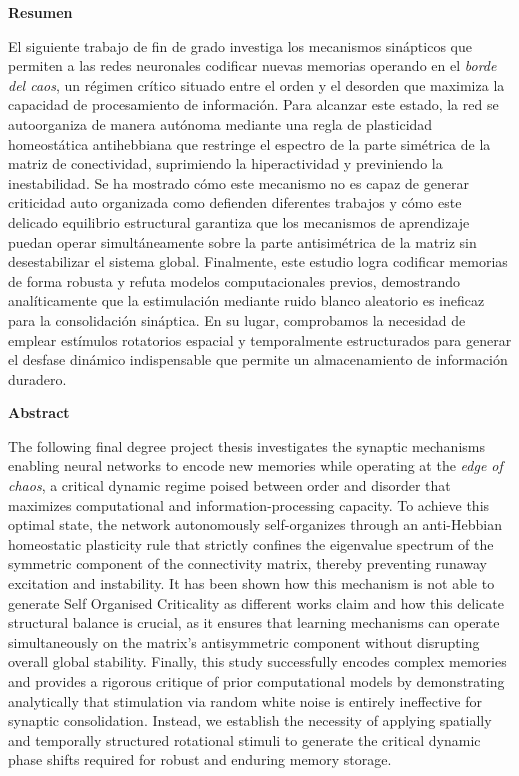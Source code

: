 \documentclass[11pt,a4paper,twoside,pdf]{article}
\numberwithin{equation}{section}
\begin{document}
\newpage
\begin{center}
{\bf Resumen}
\bigskip

\begin{minipage}{0.8\linewidth}
El siguiente trabajo de fin de grado investiga los mecanismos sinápticos que permiten a las redes neuronales codificar nuevas memorias operando en el \emph{borde del caos}, un régimen crítico situado entre el orden y el desorden que maximiza la capacidad de procesamiento de información. Para alcanzar este estado, la red se autoorganiza de manera autónoma mediante una regla de plasticidad homeostática antihebbiana que restringe el espectro de la parte simétrica de la matriz de conectividad, suprimiendo la hiperactividad y previniendo la inestabilidad. Se ha mostrado cómo este mecanismo no es capaz de generar criticidad auto organizada como defienden diferentes trabajos y cómo este delicado equilibrio estructural garantiza que los mecanismos de aprendizaje puedan operar simultáneamente sobre la parte antisimétrica de la matriz sin desestabilizar el sistema global. Finalmente, este estudio logra codificar memorias de forma robusta y refuta modelos computacionales previos, demostrando analíticamente que la estimulación mediante ruido blanco aleatorio es ineficaz para la consolidación sináptica. En su lugar, comprobamos la necesidad de emplear estímulos rotatorios espacial y temporalmente estructurados para generar el desfase dinámico indispensable que permite un almacenamiento de información duradero.
\end{minipage}
\vfill
{\bf Abstract} 
\bigskip

\begin{minipage}{0.8\linewidth}
The following final degree project thesis investigates the synaptic mechanisms enabling neural networks to encode new memories while operating at the \emph{edge of chaos}, a critical dynamic regime poised between order and disorder that maximizes computational and information-processing capacity. To achieve this optimal state, the network autonomously self-organizes through an anti-Hebbian homeostatic plasticity rule that strictly confines the eigenvalue spectrum of the symmetric component of the connectivity matrix, thereby preventing runaway excitation and instability. It has been shown how this mechanism is not able to generate Self Organised Criticality as different works claim and how this delicate structural balance is crucial, as it ensures that learning mechanisms can operate simultaneously on the matrix's antisymmetric component without disrupting overall global stability. Finally, this study successfully encodes complex memories and provides a rigorous critique of prior computational models by demonstrating analytically that stimulation via random white noise is entirely ineffective for synaptic consolidation. Instead, we establish the necessity of applying spatially and temporally structured rotational stimuli to generate the critical dynamic phase shifts required for robust and enduring memory storage.
\end{minipage}

\vfill

\end{center}
\end{document}
